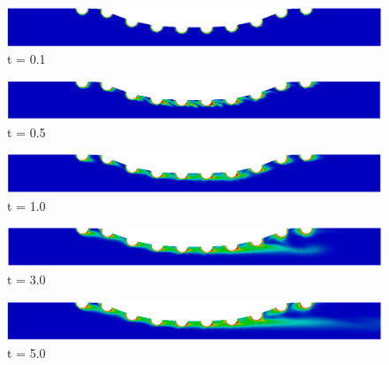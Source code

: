 \begin{figure}[H]
     \begin{minipage}{.50\linewidth}
      \centering
      \includegraphics[scale=0.18]{./02_chaps/cap_solution/figure/conc100_CurvedStrut1.png}\\
      t = 0.1
     \end{minipage}%
     \begin{minipage}{.50\linewidth}
      \centering
      \includegraphics[scale=0.18]{./02_chaps/cap_solution/figure/conc100_CurvedStrut2.png}\\
      t = 0.5
     \end{minipage}
     \begin{minipage}{.50\linewidth}
     \medskip
      \centering
      \includegraphics[scale=0.18]{./02_chaps/cap_solution/figure/conc100_CurvedStrut3.png}\\
      t = 1.0
     \end{minipage}%
     \begin{minipage}{.50\linewidth}
     \medskip
      \centering
      \includegraphics[scale=0.18]{./02_chaps/cap_solution/figure/conc100_CurvedStrut4.png}\\
      t = 3.0
     \end{minipage}
     \begin{minipage}{.50\linewidth}
      \centering
      \includegraphics[scale=0.18]{./02_chaps/cap_solution/figure/conc100_CurvedStrut5.png}\\
      t = 5.0
     \end{minipage}%

\end{figure}
